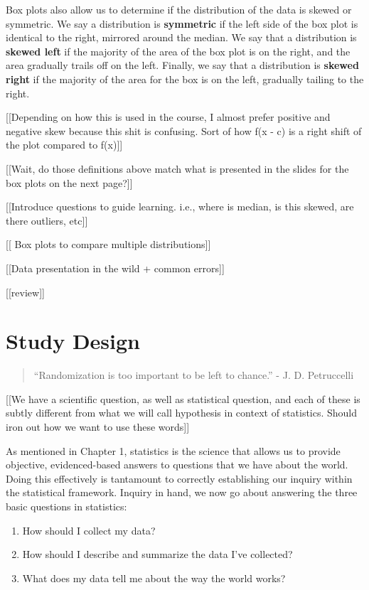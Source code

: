 \documentclass[
]{book}
\providecommand{\tightlist}{%
  \setlength{\itemsep}{0pt}\setlength{\parskip}{0pt}}
\theoremstyle{definition}
\theoremstyle{definition}
\theoremstyle{definition}
\theoremstyle{remark}
\begin{document}
Box plots also allow us to determine if the distribution of the data is skewed or symmetric. We say a distribution is \textbf{symmetric} if the left side of the box plot is identical to the right, mirrored around the median. We say that a distribution is \textbf{skewed left} if the majority of the area of the box plot is on the right, and the area gradually trails off on the left. Finally, we say that a distribution is \textbf{skewed right} if the majority of the area for the box is on the left, gradually tailing to the right.

{[}{[}Depending on how this is used in the course, I almost prefer positive and negative skew because this shit is confusing. Sort of how f(x - c) is a right shift of the plot compared to f(x){]}{]}

{[}{[}Wait, do those definitions above match what is presented in the slides for the box plots on the next page?{]}{]}

{[}{[}Introduce questions to guide learning. i.e., where is median, is this skewed, are there outliers, etc{]}{]}

{[}{[} Box plots to compare multiple distributions{]}{]}

{[}{[}Data presentation in the wild + common errors{]}{]}

{[}{[}review{]}{]}

\hypertarget{ch3}{%
\chapter{Study Design}\label{ch3}}

\begin{quote}
``Randomization is too important to be left to chance.'' - J. D. Petruccelli
\end{quote}

{[}{[}We have a scientific question, as well as statistical question, and each of these is subtly different from what we will call hypothesis in context of statistics. Should iron out how we want to use these words{]}{]}

As mentioned in Chapter 1, statistics is the science that allows us to provide objective, evidenced-based answers to questions that we have about the world. Doing this effectively is tantamount to correctly establishing our inquiry within the statistical framework. Inquiry in hand, we now go about answering the three basic questions in statistics:

\begin{enumerate}
\def\labelenumi{\arabic{enumi})}
\tightlist
\item
  How should I collect my data?\\
\item
  How should I describe and summarize the data I've collected?
\item
  What does my data tell me about the way the world works?
\end{enumerate}
\end{document}

